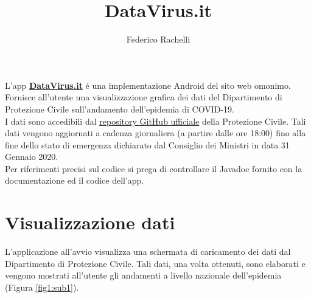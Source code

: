 \documentclass{article}
\begin{document}
    \author{Federico Rachelli}
    \title{\vspace{-2cm}DataVirus.it}
    \maketitle

    L'app \textbf{\href{https://datavirus.it}{DataVirus.it}} é una implementazione Android del sito web omonimo.
    Fornisce all'utente una visualizzazione grafica dei dati del Dipartimento di Protezione Civile sull'andamento dell'epidemia di COVID-19.
    \\
    I dati sono accedibili dal \href{https://github.com/pcm-dpc/COVID-19}{repository GitHub ufficiale} della Protezione Civile. 
    Tali dati vengono aggiornati a cadenza giornaliera (a partire dalle ore 18:00) fino alla fine dello stato di emergenza dichiarato dal Consiglio dei Ministri in data 31 Gennaio 2020.
    \\
    Per riferimenti precisi sul codice si prega di controllare il Javadoc fornito con la documentazione ed il codice dell'app.
    
    \section{Visualizzazione dati}
    L'applicazione all'avvio visualizza una schermata di caricamento dei dati dal Dipartimento di Protezione Civile. 
    Tali dati, una volta ottenuti, sono elaborati e vengono mostrati all'utente gli andamenti a livello nazionale dell'epidemia (Figura \ref{fig1:sub1}).
    
\end{document}
